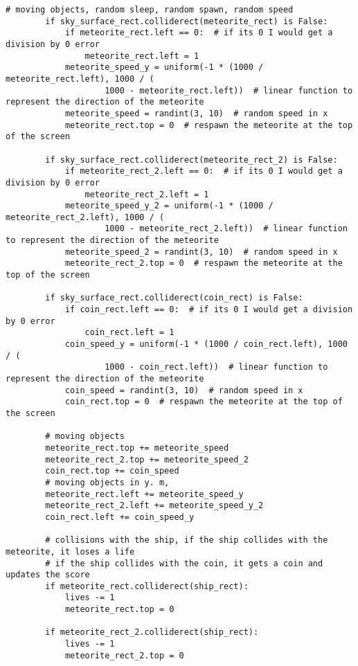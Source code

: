 \documentclass[12pt]{report}			%
\begin{document}
\begin{appendices}
\begin{lstlisting}[title={Program hra.py}, caption={hra.py},  label={lst:hra}]
        # moving objects, random sleep, random spawn, random speed
        if sky_surface_rect.colliderect(meteorite_rect) is False:
            if meteorite_rect.left == 0:  # if its 0 I would get a division by 0 error
                meteorite_rect.left = 1
            meteorite_speed_y = uniform(-1 * (1000 / meteorite_rect.left), 1000 / (
                    1000 - meteorite_rect.left))  # linear function to represent the direction of the meteorite
            meteorite_speed = randint(3, 10)  # random speed in x
            meteorite_rect.top = 0  # respawn the meteorite at the top of the screen

        if sky_surface_rect.colliderect(meteorite_rect_2) is False:
            if meteorite_rect_2.left == 0:  # if its 0 I would get a division by 0 error
                meteorite_rect_2.left = 1
            meteorite_speed_y_2 = uniform(-1 * (1000 / meteorite_rect_2.left), 1000 / (
                    1000 - meteorite_rect_2.left))  # linear function to represent the direction of the meteorite
            meteorite_speed_2 = randint(3, 10)  # random speed in x
            meteorite_rect_2.top = 0  # respawn the meteorite at the top of the screen

        if sky_surface_rect.colliderect(coin_rect) is False:
            if coin_rect.left == 0:  # if its 0 I would get a division by 0 error
                coin_rect.left = 1
            coin_speed_y = uniform(-1 * (1000 / coin_rect.left), 1000 / (
                    1000 - coin_rect.left))  # linear function to represent the direction of the meteorite
            coin_speed = randint(3, 10)  # random speed in x
            coin_rect.top = 0  # respawn the meteorite at the top of the screen

        # moving objects
        meteorite_rect.top += meteorite_speed
        meteorite_rect_2.top += meteorite_speed_2
        coin_rect.top += coin_speed
        # moving objects in y. m,
        meteorite_rect.left += meteorite_speed_y
        meteorite_rect_2.left += meteorite_speed_y_2
        coin_rect.left += coin_speed_y

        # collisions with the ship, if the ship collides with the meteorite, it loses a life
        # if the ship collides with the coin, it gets a coin and updates the score
        if meteorite_rect.colliderect(ship_rect):
            lives -= 1
            meteorite_rect.top = 0

        if meteorite_rect_2.colliderect(ship_rect):
            lives -= 1
            meteorite_rect_2.top = 0


\end{lstlisting}
\end{appendices}
\end{document}
